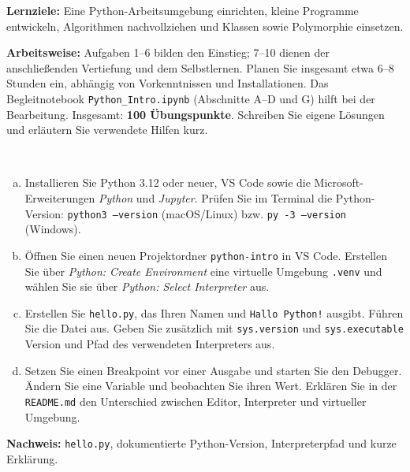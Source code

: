 \newcommand{\printpraesenzlsg}{false}
\newcommand{\printloesungen}{false}
\newcommand{\printbewertungen}{false}
\newcommand{\blattnummer}{1}

\lstset{language=Python,basicstyle=\small\ttfamily,numbers=none,showstringspaces=false,columns=fullflexible,keepspaces=true}



\textbf{Lernziele:} Eine Python-Arbeitsumgebung einrichten, kleine Programme entwickeln,
Algorithmen nachvollziehen und Klassen sowie Polymorphie einsetzen.

\textbf{Arbeitsweise:} Aufgaben 1--6 bilden den Einstieg; 7--10 dienen der anschließenden
Vertiefung und dem Selbstlernen. Planen Sie insgesamt etwa 6--8 Stunden ein, abhängig
von Vorkenntnissen und Installationen. Das Begleitnotebook \texttt{Python\_Intro.ipynb}
(Abschnitte A--D und G) hilft bei der Bearbeitung. Insgesamt: \textbf{100 Übungspunkte}.
Schreiben Sie eigene Lösungen und erläutern Sie verwendete Hilfen kurz.

\\
\begin{enumerate}[a)]
\item Installieren Sie Python 3.12 oder neuer, VS Code sowie die Microsoft-Erweiterungen
\emph{Python} und \emph{Jupyter}. Prüfen Sie im Terminal die Python-Version:
\texttt{python3 --version} (macOS/Linux) bzw. \texttt{py -3 --version} (Windows).
\item Öffnen Sie einen neuen Projektordner \texttt{python-intro} in VS Code.
Erstellen Sie über \emph{Python: Create Environment} eine virtuelle Umgebung
\texttt{.venv} und wählen Sie sie über \emph{Python: Select Interpreter} aus.
\item Erstellen Sie \texttt{hello.py}, das Ihren Namen und \texttt{Hallo Python!} ausgibt.
Führen Sie die Datei aus. Geben Sie zusätzlich mit \texttt{sys.version} und
\texttt{sys.executable} Version und Pfad des verwendeten Interpreters aus.
\item Setzen Sie einen Breakpoint vor einer Ausgabe und starten Sie den Debugger.
Ändern Sie eine Variable und beobachten Sie ihren Wert. Erklären Sie in der
\texttt{README.md} den Unterschied zwischen Editor, Interpreter und virtueller Umgebung.
\end{enumerate}
\textbf{Nachweis:} \texttt{hello.py}, dokumentierte Python-Version, Interpreterpfad und kurze Erklärung.

